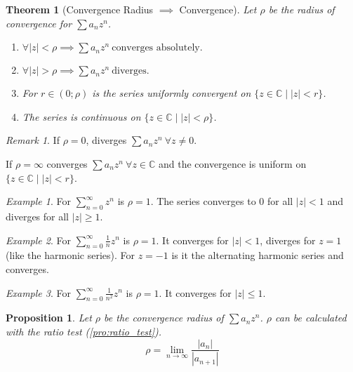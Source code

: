 \documentclass[english,titlepage]{uzhpub}
\theoremstyle{definition}
\theoremstyle{plain}
\newtheorem{proposition}[definition]{Proposition}
\newtheorem{theorem}[definition]{Theorem} %
\theoremstyle{remark}
\newtheorem*{remark}{Remark}
\theoremstyle{example}
\newtheorem*{example}{Example}
\begin{document}
   \begin{theorem}[Convergence Radius \(\implies\) Convergence]\label{thm:conv_radius}
      Let \(\rho\) be the radius of convergence for \(\sum a_n z^n\).
      \begin{enumerate}[label=\roman*, align=Center]
         \item \(\forall |z| < \rho \implies \sum a_n z^n~\text{converges absolutely.}\)
         \item \(\forall |z| > \rho \implies \sum a_n z^n~\text{diverges.}\)
         \item For \(r \in (0;\rho)\) is the series uniformly convergent on \(\{z \in \mathbb{C} \mid |z| < r\}\).
         \item The series is continuous on \(\{z \in \mathbb{C} \mid |z| < \rho\}\).
      \end{enumerate}
   \end{theorem}
   \begin{remark}
      If \(\rho = 0\), diverges \(\sum a_nz^n~\forall z \neq 0\).

      If \(\rho = \infty\) converges \(\sum a_nz^n~\forall z \in \mathbb{C}\) and the convergence is uniform on \(\{z \in \mathbb{C} \mid |z| < r\}\).
   \end{remark}
   \begin{example}
      For \(\sum_{n=0}^\infty z^n\) is \(\rho = 1\).
      The series converges to 0 for all \(|z| < 1\) and diverges for all \(|z| \geq 1\).
   \end{example}
   \begin{example}
      For \(\sum_{n=0}^\infty \frac{1}{n} z^n\) is \(\rho = 1\).
      It converges for \(|z| < 1\), diverges for \(z = 1\) (like the harmonic series).
      For \(z = -1\) is it the alternating harmonic series and converges.
   \end{example}
   \begin{example}
      For \(\sum_{n=0}^\infty \frac{1}{n^2} z^n\) is \(\rho = 1\).
      It converges for \(|z| \leq 1\).
   \end{example}

   \begin{proposition}\label{pro:conv_rad_ratio_test}
      Let \(\rho\) be the convergence radius of \(\sum a_n z^n\).
      \(\rho\) can be calculated with the ratio test (\ref{pro:ratio_test}).
      \[\rho = \lim_{n \to \infty} \frac{|a_n|}{|a_{n+1}|}\]
   \end{proposition}
\end{document}
